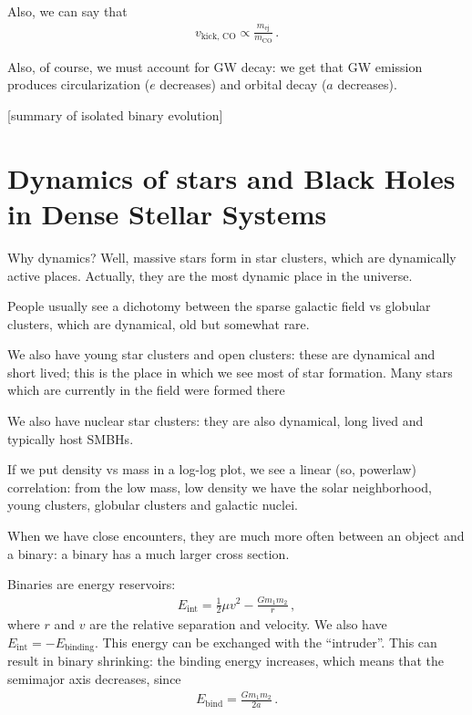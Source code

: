 \documentclass[main.tex]{subfiles}
\begin{document}
Also, we can say that 
%
\begin{align}
v _{\text{kick, CO}} \propto \frac{ m _{\text{ej}}}{m _{\text{CO}}}
\,.
\end{align}

Also, of course, we must account for GW decay: we get that GW emission produces circularization (\(e\) decreases) and orbital decay (\(a\) decreases). 

[summary of isolated binary evolution]

\section{Dynamics of stars and Black Holes in Dense Stellar Systems}

Why dynamics? 
Well, massive stars form in star clusters, which are dynamically active places. Actually, they are the most dynamic place in the universe. 

People usually see a dichotomy between the sparse galactic field vs globular clusters, which are dynamical, old but somewhat rare. 

We also have young star clusters and open clusters: these are dynamical and short lived; this is the place in which we see most of star formation. Many stars which are currently in the field were formed there

We also have nuclear star clusters: they are also dynamical, long lived and typically host SMBHs. 

If we put density vs mass in a log-log plot, we see a linear (so, powerlaw) correlation: from the low mass, low density we have the solar neighborhood, young clusters, globular clusters and galactic nuclei.

When we have close encounters, they are much more often between an object and a binary: a binary has a much larger cross section. 

Binaries are energy reservoirs: 
%
\begin{align}
E _{\text{int}} = \frac{1}{2} \mu v^2  - \frac{G m_1 m_2 }{r}
\,,
\end{align}
%
where \(r\) and \(v\) are the relative separation and velocity. We also have \(E _{\text{int}} = - E _{\text{binding}}\). 
This energy can be exchanged with the ``intruder''. 
This can result in binary shrinking: the binding energy increases, which means that the semimajor axis decreases, since 
%
\begin{align}
E _{\text{bind}} = \frac{ G m_1 m_2 }{2a}
\,.
\end{align}
\end{document}
